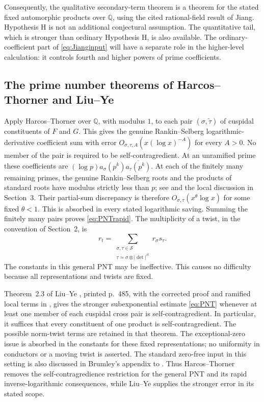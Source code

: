 \documentclass[11pt]{article}
\numberwithin{equation}{section}
\theoremstyle{remark}
\newcommand{\Q}{\mathbb Q}
\begin{document}
Consequently, the qualitative secondary-term theorem is a theorem for
the stated fixed automorphic products over $\Q$, using the cited
rational-field result of Jiang. Hypothesis H is not an additional
conjectural assumption. The quantitative tail, which is stronger than
ordinary Hypothesis H, is also available. The ordinary-coefficient part
of \eqref{eq:Jianginput} will have a separate role in the higher-level
calculation: it controls fourth and higher powers of prime coefficients.

\subsection{The prime number theorems of Harcos--Thorner and Liu--Ye}

Apply Harcos--Thorner \cite[Theorem 2.1]{HT} over $\Q$, with modulus
$1$, to each pair $(\sigma,\widetilde\tau)$ of cuspidal
constituents of $F$ and $G$. This gives the genuine Rankin--Selberg
logarithmic-derivative coefficient sum with error
$O_{\sigma,\tau,A}(x(\log x)^{-A})$ for every $A>0$. No member of
the pair is required to be self-contragredient. At an unramified
prime these coefficients are
$(\log p)a_\sigma(p^k)\overline{a_\tau(p^k)}$.
At each of the finitely many remaining primes, the genuine
Rankin--Selberg roots and the products of standard roots have
modulus strictly less than $p$; see \cite[(3.9)--(3.10)]{HT} and the
local discussion in Section~3. Their partial-sum discrepancy is
therefore $O_{\sigma,\tau}(x^\theta\log x)$ for some fixed
$\theta<1$. This is absorbed in every stated logarithmic saving.
Summing the finitely many pairs proves \eqref{eq:PNTrapid}.
The multiplicity of a twist, in the convention of Section~2, is
\begin{equation}\label{eq:PNTrtau}
 r_t=\sum_{\substack{\sigma,\tau\in\mathcal S\\
               \tau\simeq\sigma\otimes|\det|^{it}}}
                  r_\sigma s_\tau.
\end{equation}
The constants in this general PNT may be ineffective. This causes
no difficulty because all representations and twists are fixed.

Theorem~2.3 of Liu--Ye \cite{LY07}, printed p.~485, with the
corrected proof and ramified local terms in \cite{Ycorr}, gives the
stronger subexponential estimate \eqref{eq:PNT} whenever at least
one member of each cuspidal cross pair is self-contragredient.
In particular, it suffices that every constituent of one product
is self-contragredient. The possible norm-twist terms are retained
in that theorem. The exceptional-zero issue is absorbed in the
constants for these fixed representations; no uniformity in
conductors or a moving twist is asserted. The standard zero-free
input in this setting is also discussed in Brumley's appendix to
\cite{Humphries}. Thus Harcos--Thorner removes the
self-contragredience restriction for the general PNT and its
rapid inverse-logarithmic consequences, while Liu--Ye supplies
the stronger error in its stated scope.
\end{document}
